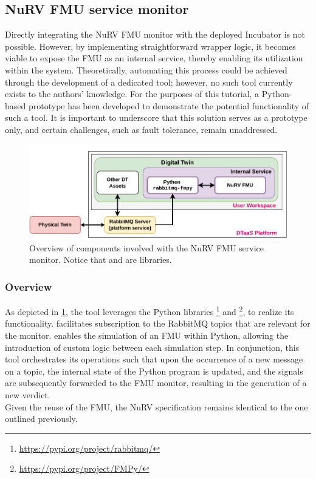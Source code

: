 \subsection{NuRV FMU service monitor}\label{subsec:NuRVsermoni}
Directly integrating the NuRV FMU monitor with the deployed Incubator is not possible.
However, by implementing straightforward wrapper logic, it becomes viable to expose the FMU as an internal service, thereby enabling its utilization within the system.
Theoretically, automating this process could be achieved through the development of a dedicated tool; however, no such tool currently exists to the authors' knowledge.
For the purposes of this tutorial, a Python-based prototype has been developed to demonstrate the potential functionality of such a tool.
It is important to underscore that this solution serves as a prototype only, and certain challenges, such as fault tolerance, remain unaddressed.%
%
\begin{figure}[ht]
	\centering
	\includegraphics[width=\columnwidth]{images/NuRV-FMU-integration.pdf}
	\caption{Overview of components involved with the NuRV FMU service monitor. Notice that  and  are libraries.}
	\label{fig:nurv-fmu-service}
\end{figure}%
%
\subsubsection{Overview}
As depicted in \cref{fig:nurv-fmu-service}, the tool leverages the Python libraries \footnote{\url{https://pypi.org/project/rabbitmq/}} and \footnote{\url{https://pypi.org/project/FMPy/}}, to realize its functionality.
 facilitates subscription to the RabbitMQ topics that are relevant for the monitor.
 enables the simulation of an FMU within Python, allowing the introduction of custom logic between each simulation step.
In conjunction, this tool orchestrates its operations such that upon the occurrence of a new message on a topic, the internal state of the Python program is updated, and the signals are subsequently forwarded to the FMU monitor, resulting in the generation of a new verdict.\\
Given the reuse of the FMU, the NuRV specification remains identical to the one outlined previously.

